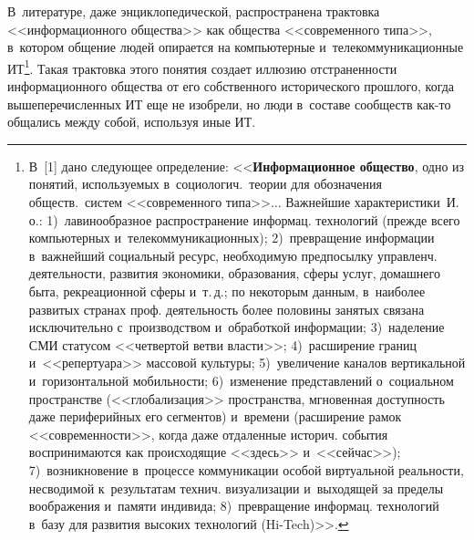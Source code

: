  
  



\thispagestyle{headings}

\begin{multicols}{2}

\label{st\stat}
  
  В~литературе, даже энциклопедической, распространена трактовка 
<<информационного общества>> как общества <<современного типа>>, 
в~котором общение людей опирается на компьютерные 
и~телекоммуникационные ИТ\footnote[2]{В~[1] дано следующее определение:
<<\textbf{Информационное общество}, одно из понятий, используемых 
в~социологич.\ теории для обозначения обществ.\ систем <<современного типа>>$\ldots$ 
Важнейшие характеристики~И.\,о.: 1)~лавинообразное распространение информац. 
технологий (прежде всего компьютерных и~телекоммуникационных); 2)~превращение 
информации в~важнейший социальный ресурс, необходимую предпосылку управленч. 
деятельности, развития экономики, образования, сферы услуг, домашнего быта, 
рекреационной сферы и~т.\,д.; по некоторым данным, в~наиболее развитых странах проф. 
деятельность более половины занятых связана исключительно с~производством и~обработкой 
информации; 3)~наделение СМИ статусом <<четвертой ветви власти>>; 4)~расширение 
границ и~<<репертуара>> массовой культуры; 5)~увеличение каналов вертикальной 
и~горизонтальной мобильности; 6)~изменение представлений о~социальном пространстве 
(<<глобализация>> пространства, мгновенная доступность даже периферийных его 
сегментов) и~времени (расширение рамок <<современности>>, когда даже отдаленные 
историч. события воспринимаются как происходящие <<здесь>> и~<<сейчас>>); 
7)~возникновение в~процессе коммуникации особой виртуальной реальности, несводимой 
к~результатам технич. визуализации и~выходящей за пределы воображения и~памяти 
индивида; 8)~превращение информац. технологий в~базу для развития высоких технологий 
(Hi-Tech)>>.}. Такая трактовка этого понятия создает иллюзию 
отстраненности информационного общества от его собственного исторического 
прошлого, когда вышеперечисленных ИТ еще не изобрели, но люди в~составе 
сообществ как-то общались между собой, используя иные ИТ. 


\end{multicols}
